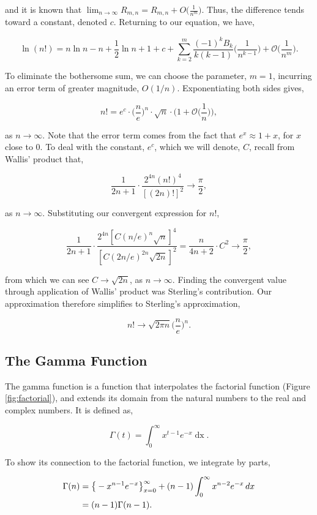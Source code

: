 \documentclass[11pt]{amsart}
\begin{document}
and it is known that $\lim_{n \to \infty}R_{m,n} = R_{m,n} + O\Big(\frac{1}{n^m}\Big)$. Thus, the difference tends toward a constant, denoted $c$. Returning to our equation, we have,

$$\ln(n!) = n\ln n - n + \frac{1}{2}\ln n + 1 + c + \sum_{k=2}^{m} \frac{(-1)^kB_k}{k(k-1)}\Bigg(\frac{1}{n^{k-1}}\Bigg) + \mathcal{O}\Bigg(\frac{1}{n^m}\Bigg).$$

To eliminate the bothersome sum, we can choose the parameter, $m = 1$, incurring an error term of greater magnitude, $O(1/n)$. Exponentiating both sides gives,

$$n! = e^c\cdot\Bigg(\frac{n}{e}\Bigg)^n \cdot \sqrt{n} \cdot \Bigg(1 + \mathcal{O}\Bigg(\frac{1}{n}\Bigg)\Bigg),$$

as $n \to \infty$. Note that the error term comes from the fact that $e^x \approx 1 + x$, for $x$ close to 0. To deal with the constant, $e^c$, which we will denote, $C$, recall from Wallis' product that,

$$\frac{1}{2n + 1} \cdot \frac{2^{4n}(n!)^4}{[(2n)!]^2} \to \frac{\pi}{2},$$

as $n \to \infty$. Substituting our convergent expression for $n!$,

$$\frac{1}{2n + 1} \cdot \frac{2^{4n}[C(n/e)^n\sqrt{n}]^4}{[C(2n/e)^{2n}\sqrt{2n}]^2} = \frac{n}{4n + 2}\cdot C^2 \to \frac{\pi}{2},$$

from which we can see $C \to \sqrt{2n}$, as $n \to \infty$. Finding the convergent value through application of Wallis' product was Sterling's contribution. Our approximation therefore simplifies to Sterling's approximation,

$$n! \to \sqrt{2\pi n}\Bigg(\frac{n}{e}\Bigg)^n.$$

\subsection{The Gamma Function}

The gamma function is a function that interpolates the factorial function (Figure \ref{fig:factorial}), and extends its domain from the natural numbers to the real and complex numbers. It is defined as,

$$\Gamma(t) = \int_0^{\infty} x^{t-1}e^{-x}\mathop{dx}.$$

To show its connection to the factorial function, we integrate by parts,

\begin{align}
\Gamma(n) &= \big\{-x^{n-1}e^{-x}\big\}_{x=0}^{\infty} + (n - 1)\int_0^{\infty} x^{n-2}e^{-x}\mathop{dx} \notag \\
&= (n-1)\Gamma(n-1).\notag
\end{align}
\end{document}

